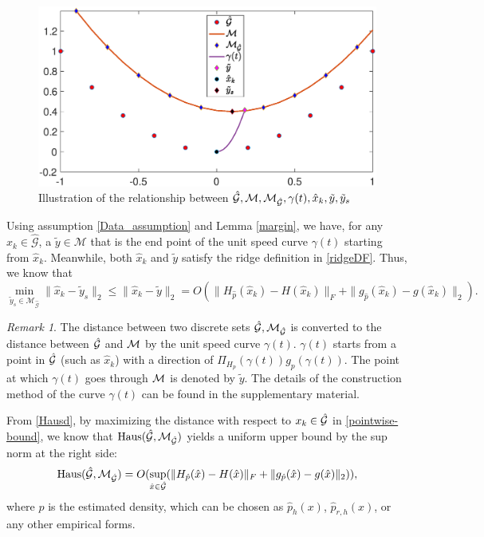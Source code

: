 \documentclass[aos,preprint]{imsart}
\theoremstyle{remark}
\newtheorem*{remark}{Remark}
\begin{document}
\begin{figure}[htbp] %
   \centering
   \includegraphics[width=0.8\linewidth]{demoMG.eps} 
   \caption{Illustration of the relationship  between $\hat{\cal G},{\cal M}, {\cal M}_{\cal \hat{G}}, \gamma(t),\hat{x}_k, \tilde{y}, \tilde{y}_s$}
   \label{fig:example}
\end{figure}


Using assumption \ref{Data_assumption} and Lemma \ref{margin}, we have, for any $\hat{x}_k\in \hat{\mathcal G}$, a $\tilde{y}\in {\mathcal M}$ that is the end point of the unit speed curve $\gamma(t)$ starting from $\hat{x}_k$. Meanwhile, both  $\hat{x}_k$ and $\tilde{y}$ satisfy the ridge definition in \eqref{ridgeDF}. 
Thus, we know that 
\begin{equation}\label{pointwise-bound}
\min_{\tilde{y}_s\in {\mathcal M}_{\hat{\mathcal G}}}\|\hat{x}_k-\tilde{y}_s\|_2 \leq \|\hat{x}_k-\tilde{y}\|_2 = O (\|H_{\hat{p}}(\hat{x}_k)-H(\hat{x}_k)\|_F+\|g_{\hat{p}}(\hat{x}_k)-g(\hat{x}_k)\|_2  ).
\end{equation}
\begin{remark}
The distance between two discrete sets $\hat{\cal G}, {\cal M}_{\hat{\cal G}}$ is converted to the distance between $\hat{\cal G}$ and ${\cal M}$ by the unit speed curve $\gamma(t)$. $\gamma(t)$ starts from a point in $\hat{\cal G}$ (such as $\hat{x}_k$) with a direction of $\Pi_{H_p}(\gamma(t)) g_{p}(\gamma(t))$. The point at which $\gamma(t)$ goes through $\cal M$ is denoted by $\tilde{y}$. The details of the construction method of the curve $\gamma(t)$ can be found in the supplementary material.
\end{remark}
From \eqref{Hausd}, by maximizing the distance with respect to $x_k\in 
\hat{\cal G}$ in \eqref{pointwise-bound}, we know that ${\rm Haus}({\mathcal {\hat{G}}}, {\mathcal M}_{\mathcal {\hat{G}}})$ yields a uniform upper bound by the sup norm at the right side:
\begin{equation}\label{Hausmargin}
{\rm Haus}({\hat{\mathcal G}}, {\mathcal M}_{\hat{\mathcal G}}) = O (\sup_{\hat{x}\in\hat{\cal G}}( \|H_{\hat{p}}(\hat{x})-H(\hat{x})\|_F+\|g_{\hat{p}}(\hat{x})-g(\hat{x})\|_2 ) ),
\end{equation}
where $\hat{p}$ is the estimated density, which can be chosen as $\hat{p}_h(x)$, $\hat{p}_{r,h}(x)$, or any other empirical forms.
\end{document}
